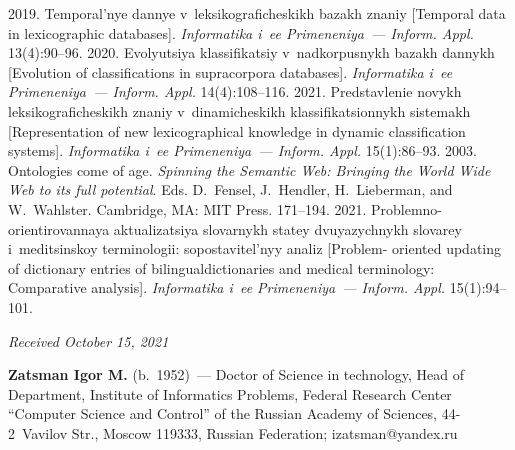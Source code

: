 \begin{multicols}{2}
{{\begin{thebibliography}{99}
 2019. Tem\-po\-ral'\-nye 
dannye 
v~leksikograficheskikh bazakh znaniy [Temporal data in lexicographic databases]. \textit{Informatika 
i~ee Primeneniya~--- Inform. Appl.} 13(4):90--96.
 2020. Evolyutsiya klassifikatsiy 
v~nadkorpusnykh ba\-zakh dannykh [Evolution of classifications in supracorpora databases]. 
\textit{Informatika i~ee Primeneniya~--- Inform. \mbox{Appl}.} 14(4):108--116.
 2021. Predstavlenie novykh 
leksikograficheskikh znaniy v~dinamicheskikh klassifikatsionnykh sistemakh [Representation of new 
lexicographical knowledge in dynamic classification systems]. \textit{Informatika i~ee 
 Primeneniya~--- Inform. Appl.}  15(1):86--93.
 2003. Ontologies come of age. \textit{Spinning the Semantic Web: Bringing 
the World Wide Web to its full potential}. Eds. D.~Fensel, J.~Hendler, H.~Lieberman, and 
W.~Wahlster. Cambridge, MA: MIT Press. 171--194.
 2021. Problemno-orientirovannaya ak\-tu\-a\-li\-za\-tsiya slovarnykh statey dvuyazychnykh 
slovarey i~me\-di\-tsin\-skoy terminologii: sopostavitel'nyy analiz [Problem- oriented updating of dictionary 
entries of bilingual\linebreak dictionaries and medical terminology: Comparative analysis]. \textit{Informatika 
i~ee Primeneniya~--- Inform. Appl.} 15(1):94--101.
\end{thebibliography}

 }
 }

\end{multicols}

\vspace*{-11pt}

\hfill{\small\textit{Received October 15, 2021}}


\vspace*{-12pt}





\Contrl

\vspace*{-4pt}

\noindent
\textbf{Zatsman Igor M.} (b.\ 1952)~--- Doctor of Science in technology, Head of Department, 
Institute of Informatics Problems, Federal Research Center ``Computer Science and Control'' of the 
Russian Academy of Sciences, 44-2~Vavilov Str., Moscow 119333, Russian Federation; 
\mbox{izatsman@yandex.ru}

\label{end\stat}

\renewcommand{\bibname}{\protect\rm Литература}